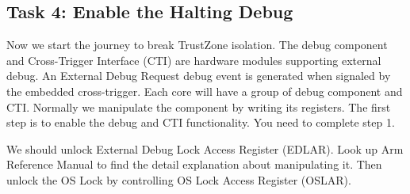 \subsection{Task 4: Enable the Halting Debug}

Now we start the journey to break TrustZone isolation. The debug component and Cross-Trigger Interface (CTI) are hardware modules supporting external debug. An External Debug Request debug event is generated when signaled by the embedded cross-trigger. Each core will have a group of debug component and CTI. Normally we manipulate the component by writing its registers. The first step is to enable the debug and CTI functionality. You need to complete step 1.

We should unlock External Debug Lock Access Register (EDLAR). Look up Arm Reference Manual to find the detail explanation about manipulating it. Then unlock the OS Lock by controlling OS Lock Access Register (OSLAR).


